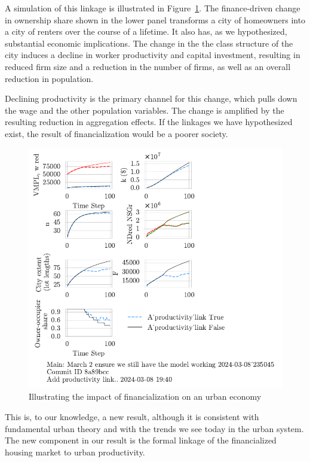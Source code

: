 A simulation of this linkage is illustrated in Figure~\ref{fig-impact-channel-example}. The finance-driven change in ownership share shown in the lower panel transforms a city of homeowners into a city of renters over the course of a lifetime. It also has, as we hypothesized, substantial economic implications. The change in the the class structure of the city induces a decline in worker productivity and capital investment, resulting in reduced firm size and a reduction in the number of firms, as well as an overall reduction in population. 

Declining productivity is the primary channel for this change, which pulls down the wage and the other population variables. The change is amplified by the resulting reduction in aggregation effects.  If the linkages we have hypothesized exist, the result of financialization would be a poorer society. 

\begin{figure}[h!tb]\label{fig-impact-channel-example}
    \centering
    \includegraphics[scale=1, trim=.25cm 2cm .25cm .25cm, clip]{fig/productivity_link.pdf}
    \caption{Illustrating the impact of financialization on an urban economy}
\end{figure}
This is, to our knowledge, a new result, although it is consistent with fundamental urban theory and with the trends we see today in the urban system. The new component in our result is the formal linkage of the financialized housing market to urban productivity.

